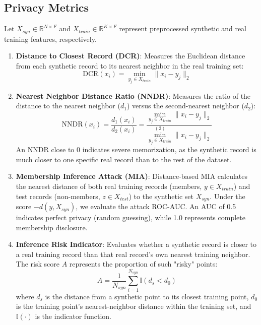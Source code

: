 \documentclass[journal]{IEEEtran}
\begin{document}
\subsection{Privacy Metrics}
Let $X_{syn} \in \mathbb{R}^{N \times F}$ and $X_{train} \in \mathbb{R}^{K \times F}$ represent preprocessed synthetic and real training features, respectively.
\begin{enumerate}
    \item \textbf{Distance to Closest Record (DCR)}: Measures the Euclidean distance from each synthetic record to its nearest neighbor in the real training set:
    \begin{equation}
        \text{DCR}(x_i) = \min_{y_j \in X_{train}} \|x_i - y_j\|_2
    \end{equation}
    \item \textbf{Nearest Neighbor Distance Ratio (NNDR)}: Measures the ratio of the distance to the nearest neighbor ($d_1$) versus the second-nearest neighbor ($d_2$):
    \begin{equation}
        \text{NNDR}(x_i) = \frac{d_1(x_i)}{d_2(x_i)} = \frac{\min_{y_j \in X_{train}} \|x_i - y_j\|_2}{\min^{(2)}_{y_j \in X_{train}} \|x_i - y_j\|_2}
    \end{equation}
    An NNDR close to 0 indicates severe memorization, as the synthetic record is much closer to one specific real record than to the rest of the dataset.
    \item \textbf{Membership Inference Attack (MIA)}: Distance-based MIA calculates the nearest distance of both real training records (members, $y \in X_{train}$) and test records (non-members, $z \in X_{test}$) to the synthetic set $X_{syn}$. Under the score $-d(y, X_{syn})$, we evaluate the attack ROC-AUC. An AUC of 0.5 indicates perfect privacy (random guessing), while 1.0 represents complete membership disclosure.
    \item \textbf{Inference Risk Indicator}: Evaluates whether a synthetic record is closer to a real training record than that real record's own nearest training neighbor. The risk score $A$ represents the proportion of such "risky" points:
    \begin{equation}
        A = \frac{1}{N_{syn}} \sum_{i=1}^{N_{syn}} \mathbb{I}(d_s < d_0)
    \end{equation}
    where $d_s$ is the distance from a synthetic point to its closest training point, $d_0$ is the training point's nearest-neighbor distance within the training set, and $\mathbb{I}(\cdot)$ is the indicator function.
\end{enumerate}
\end{document}
